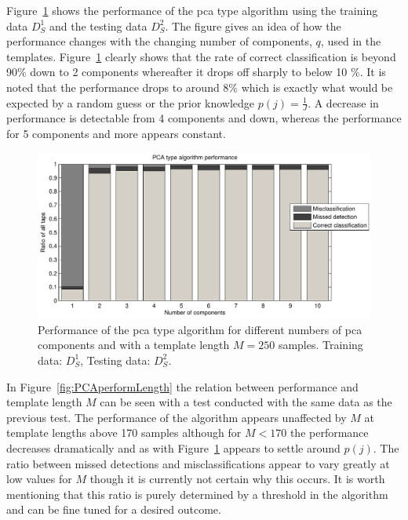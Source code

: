 Figure~\ref{fig:PCAperform} shows the performance of the \gls{pca} type algorithm using the training data $D^1_S$ and the testing data $D^2_S$. The figure gives an idea of how the performance changes with the changing number of components, $q$, used in the templates. Figure~\ref{fig:PCAperform} clearly shows that the rate of correct classification is beyond 90\% down to 2 components whereafter it drops off sharply to below 10 \%. It is noted that the performance drops to around 8\% which is exactly what would be expected by a random guess or the prior knowledge $p(j)= \frac{1}{J}$. A decrease in performance is detectable from 4 components and down, whereas the performance for 5 components and more appears constant.

\begin{figure}[!] %
\centering
\includegraphics[width=150mm]{PCAperform.pdf}
\caption{Performance of the \gls{pca} type algorithm for different numbers of \gls{pca} components and with a template length $M=250$ samples. Training data: $D^1_S$, Testing data: $D^2_S$.}\label{fig:PCAperform}
\end{figure}

In Figure~\ref{fig:PCAperformLength} the relation between performance and template length $M$ can be seen with a test conducted with the same data as the previous test. The performance of the algorithm appears unaffected by $M$ at template lengths above 170 samples although for $M<170$ the performance decreases dramatically and as with Figure~\ref{fig:PCAperform} appears to settle around $p(j)$. The ratio between missed detections and misclassifications appear to vary greatly at low values for $M$ though it is currently not certain why this occurs. It is worth mentioning that this ratio is purely determined by a threshold in the algorithm and can be fine tuned for a desired outcome.

